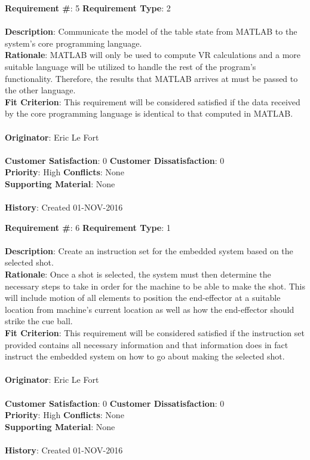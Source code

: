 \documentclass[titlepage]{article}
\begin{document}
\newpage
\begin{framed}
	\noindent\textbf{Requirement \#}: 5 \hfill \textbf{Requirement Type}: 2 \hfill\\\\
	\noindent\textbf{Description}: Communicate the model of the table state from MATLAB to the system's core programming language.\\
	\textbf{Rationale}: MATLAB will only be used to compute VR calculations and a more suitable language will be utilized to handle the rest of the program's functionality. Therefore, the results that MATLAB arrives at must be passed to the other language.\\
	\textbf{Fit Criterion}: This requirement will be considered satisfied if the data received by the core programming language is identical to that computed in MATLAB.\\\\
	\textbf{Originator}: Eric Le Fort\\\\
	\noindent\textbf{Customer Satisfaction}: 0 \hfill 	\textbf{Customer Dissatisfaction}: 0 \hfill\\
	\textbf{Priority}: High \hfill \textbf{Conflicts}: None \hfill\\
	\textbf{Supporting Material}: None\\\\
	\noindent\textbf{History}: Created 01-NOV-2016
\end{framed}

\begin{framed}
	\noindent\textbf{Requirement \#}: 6 \hfill \textbf{Requirement Type}: 1 \hfill\\\\
	\noindent\textbf{Description}: Create an instruction set for the embedded system based on the selected shot.\\
	\textbf{Rationale}: Once a shot is selected, the system must then determine the necessary steps to take in order for the machine to be able to make the shot. This will include motion of all elements to position the end-effector at a suitable location from machine's current location as well as how the end-effector should strike the cue ball.\\
	\textbf{Fit Criterion}: This requirement will be considered satisfied if the instruction set provided contains all necessary information and that information does in fact instruct the embedded system on how to go about making the selected shot.\\\\
	\textbf{Originator}: Eric Le Fort\\\\
	\noindent\textbf{Customer Satisfaction}: 0 \hfill 	\textbf{Customer Dissatisfaction}: 0 \hfill\\
	\textbf{Priority}: High \hfill \textbf{Conflicts}: None \hfill\\
	\textbf{Supporting Material}: None\\\\
	\noindent\textbf{History}: Created 01-NOV-2016
\end{framed}
\end{document}
